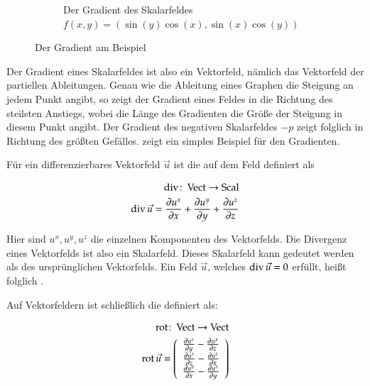 \begin{figure}[ht]
\begin{subfigure}[t]{0.45\textwidth}
		\caption{Der Gradient des Skalarfeldes $f(x,y)=(\sin(y)\cos(x),\sin(x)\cos(y))$}
\label{fig:mathematics_gradient_of_sample_scalar_field}
	\end{subfigure}
		\centering
	\caption{Der Gradient am Beispiel}
\label{fig:mathematics_gradient_of_sample_scalar_field_total}
\end{figure}

Der Gradient eines Skalarfeldes ist also ein Vektorfeld, nämlich das
Vektorfeld der partiellen Ableitungen. Genau wie die Ableitung eines
Graphen die Steigung an jedem Punkt angibt, so zeigt der Gradient
eines Feldes in die Richtung des steilsten Anstiegs, wobei die Länge des
Gradienten die Größe der Steigung in diesem Punkt angibt. Der
Gradient des negativen Skalarfeldes $-p$ zeigt folglich in Richtung
des größten Gefälles.
 zeigt
ein simples Beispiel für den Gradienten.

Für ein differenzierbares Vektorfeld $\vec{u}$ ist die
 auf dem Feld definiert als

\begin{equation}
\begin{aligned}
\operatorname*{div} \colon \operatorname*{Vect} \to \operatorname*{Scal} \\
\operatorname*{div} \vec{u}
=
\frac{\partial u^x}{\partial x} +
\frac{\partial u^y}{\partial y} +
\frac{\partial u^z}{\partial z}
\end{aligned}
\end{equation}

Hier sind $u^x,u^y,u^z$ die einzelnen Komponenten des Vektorfelds. Die
Divergenz eines Vektorfelds ist also ein Skalarfeld. Dieses Skalarfeld
kann gedeutet werden als  des
ursprünglichen Vektorfelds. Ein Feld $\vec{u}$, welches $\operatorname*{div}
\vec{u}=0$ erfüllt, heißt folglich .

Auf Vektorfeldern ist schließlich die 
definiert als:

\begin{equation}
\begin{aligned}
\operatorname*{rot} \colon \operatorname*{Vect} \to \operatorname*{Vect} \\
\operatorname*{rot} \vec{u}
=
\left(
	\begin{array}{c}
		\frac{\partial u^z}{\partial y} - \frac{\partial u^y}{\partial z} \\
		\frac{\partial u^x}{\partial z} - \frac{\partial u^z}{\partial x} \\
		\frac{\partial u^y}{\partial x} - \frac{\partial u^x}{\partial y}
	\end{array}
\right)
\end{aligned}
\end{equation}

